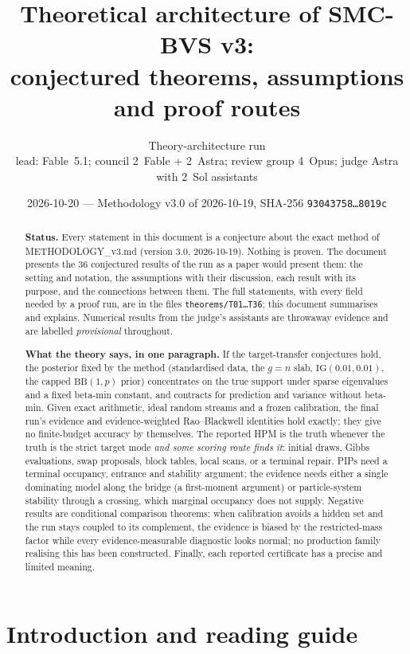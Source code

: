 \documentclass[11pt,a4paper]{article}
\title{Theoretical architecture of SMC-BVS v3:\\ conjectured theorems, assumptions and proof routes}
\author{Theory-architecture run\\ \small lead: Fable~5.1; council 2~Fable + 2~Astra; review group 4~Opus; judge Astra with 2~Sol assistants}
\date{2026-10-20 --- Methodology v3.0 of 2026-10-19, SHA-256 \texttt{93043758\ldots8019c}}
\theoremstyle{plain}
\theoremstyle{definition}
\theoremstyle{remark}
\newcommand{\IG}{\mathrm{IG}}
\newcommand{\code}[1]{\textsf{#1}}
\begin{document}
\maketitle

\begin{abstract}
\noindent\textbf{Status.} Every statement in this document is a conjecture about the exact method of \code{METHODOLOGY\_v3.md} (version 3.0, 2026-10-19). Nothing is proven. The document presents the 36 conjectured results of the run as a paper would present them: the setting and notation, the assumptions with their discussion, each result with its purpose, and the connections between them. The full statements, with every field needed by a proof run, are in the files \texttt{theorems/T01\ldots T36}; this document summarises and explains. Numerical results from the judge's assistants are throwaway evidence and are labelled \emph{provisional} throughout.

\noindent\textbf{What the theory says, in one paragraph.} If the target-transfer conjectures hold, the posterior fixed by the method (standardised data, the $g=n$ slab, $\IG(0.01,0.01)$, the capped $\mathrm{BB}(1,p)$ prior) concentrates on the true support under sparse eigenvalues and a fixed beta-min constant, and contracts for prediction and variance without beta-min. Given exact arithmetic, ideal random streams and a frozen calibration, the final run's evidence and evidence-weighted Rao--Blackwell identities hold exactly; they give no finite-budget accuracy by themselves. The reported HPM is the truth whenever the truth is the strict target mode \emph{and some scoring route finds it}: initial draws, Gibbs evaluations, swap proposals, block tables, local scans, or a terminal repair. PIPs need a terminal occupancy, entrance and stability argument; the evidence needs either a single dominating model along the bridge (a first-moment argument) or particle-system stability through a crossing, which marginal occupancy does not supply. Negative results are conditional comparison theorems: when calibration avoids a hidden set and the run stays coupled to its complement, the evidence is biased by the restricted-mass factor while every evidence-measurable diagnostic looks normal; no production family realising this has been constructed. Finally, each reported certificate has a precise and limited meaning.
\end{abstract}

\tableofcontents

\section{Introduction and reading guide}
\end{document}
